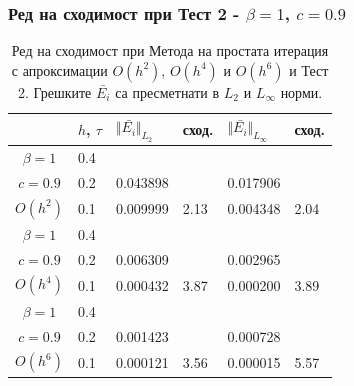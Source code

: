 \documentclass{beamer}
\begin{document}
\begin{frame}
\frametitle{Ред на сходимост при Тест 2 - $\beta = 1$, $c=0.9$}

\begin{table}[ht]
\centering
		\begin{tabular}{||c|l|ll|ll||}
			\hline
			\hline
             & $h$, $\tau$  &  	$\Vert \bar{ E_i} \Vert_{L_2}$ 	& сход.	& $\Vert \bar{ E_i}\Vert_{L_\infty}$  		&сход.   \\
   					\hline 					
			\hline 	
$\beta = 1$   	&0.4   &             &           &                & \\
     $c=0.9$     &0.2   &  0.043898  &             & 0.017906      &    \\
     $O(h^2)$	&0.1  & 0.009999 & 2.13       & 0.004348      & 2.04  \\
\hline 	
 $\beta = 1$   	&0.4  &            &               &               &     \\
     $c=0.9$  	&0.2   & 0.006309  &              & 0.002965      &        \\
     $O(h^4)$	&0.1  &  0.000432 &3.87        & 0.000200 &  3.89        \\
    \hline
 $\beta = 1$	&0.4   &             &        &               &        \\
   $ c=0.9$  	&0.2   &  0.001423  &        & 0.000728      &       \\
       $O(h^6)$	&0.1  &   0.000121 &3.56  & 0.000015 &   5.57       \\
	   \hline
			\hline 
		\end{tabular}
		\caption{Ред на сходимост при Метода на простата итерация с апроксимации $O(h^{2})$, $O(h^{4})$ и $O(h^{6})$ и Тест 2. Грешките $\bar{ E_i}$ са пресметнати в $L_2$ и $L_\infty$ норми.}
\label{tab:aB}
\end{table}

\end{frame}
\end{document}
